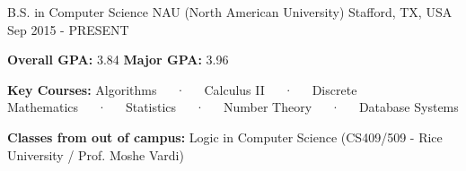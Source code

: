 \begin{cventries}
  \cventry
    {B.S. in Computer Science}
    {NAU (North American University)}
    {Stafford, TX, USA}
    {Sep 2015 - PRESENT}
    {
      \begin{cvitems}
      	\item{\textbf{Overall GPA:} 3.84
        \textbf{Major GPA:} 3.96
        }
        \item{\textbf{Key Courses:} Algorithms~~~·~~~Calculus II~~~·~~~Discrete Mathematics~~~·~~~Statistics~~~·~~~Number Theory~~~·~~~Database Systems}
        \item{\textbf{Classes from out of campus:} Logic in Computer Science (CS409/509 - Rice University / Prof. Moshe Vardi)}
      \end{cvitems}
    }
\end{cventries}
